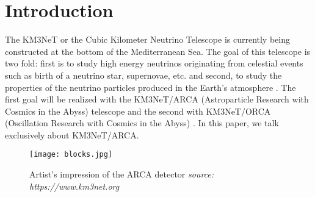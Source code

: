 

\chapter{Introduction}





The KM3NeT or the Cubic Kilometer Neutrino Telescope is currently being
constructed at the bottom of the Mediterranean Sea. The goal of this telescope
is two fold: first is to study high energy neutrinos originating from celestial
events such as birth of a neutrino star, supernovae, etc. and second, to study
the properties of the neutrino particles produced in the Earth's atmosphere
\cite{adrian2016letter}. The first goal will be realized with the KM3NeT/ARCA
(Astroparticle Research with Cosmics in the Abyss) telescope and the second
with KM3NeT/ORCA (Oscillation Research with Cosmics in the Abyss)
\cite{adrian2016letter}. In this paper, we talk exclusively about KM3NeT/ARCA.

\begin{figure}[h]
  \centering
  \texttt{[image: blocks.jpg]}
  \caption{Artist's impression of the ARCA detector \textit{source: https://www.km3net.org}}%
  \label{fig:blocks}
\end{figure}

